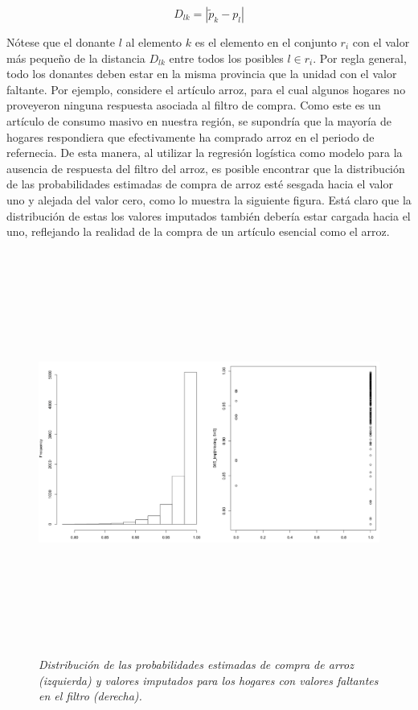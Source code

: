 \documentclass[12pt,spanish,]{book}
\begin{document}
\[
D_{lk} = |\tilde p_k - p_l|
\]

Nótese que el donante \(l\) al elemento \(k\) es el elemento en el conjunto \(r_i\) con el valor más pequeño de la distancia \(D_{lk}\) entre todos los posibles \(l \in r_i\). Por regla general, todo los donantes deben estar en la misma provincia que la unidad con el valor faltante. Por ejemplo, considere el artículo arroz, para el cual algunos hogares no proveyeron ninguna respuesta asociada al filtro de compra. Como este es un artículo de consumo masivo en nuestra región, se supondría que la mayoría de hogares respondiera que efectivamente ha comprado arroz en el periodo de refernecia. De esta manera, al utilizar la regresión logística como modelo para la ausencia de respuesta del filtro del arroz, es posible encontrar que la distribución de las probabilidades estimadas de compra de arroz esté sesgada hacia el valor uno y alejada del valor cero, como lo muestra la siguiente figura. Está claro que la distribución de estas los valores imputados también debería estar cargada hacia el uno, reflejando la realidad de la compra de un artículo esencial como el arroz.

\begin{figure}
\centering
\includegraphics[width=\textwidth,height=5.20833in]{Pics/11.png}
\caption{\emph{Distribución de las probabilidades estimadas de compra de arroz (izquierda) y valores imputados para los hogares con valores faltantes en el filtro (derecha).}}
\end{figure}
\end{document}
